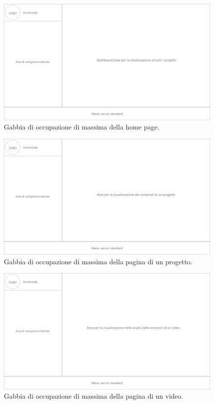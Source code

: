 \begin{figure}[H]
	\centering
	\caption{Gabbia di occupazione di massima della home page.}
	\label{fig:gabbie-massima:home-page}
	\includegraphics[width=\textwidth]{images/gabbie-di-massima/Home}
\end{figure}

\begin{figure}[H]
	\centering
	\caption{Gabbia di occupazione di massima della pagina di un progetto.}
	\label{fig:gabbie-massima:project}
	\includegraphics[width=\textwidth]{images/gabbie-di-massima/Progetto}
\end{figure}

\begin{figure}[H]
	\centering
	\caption{Gabbia di occupazione di massima della pagina di un video.}
	\label{fig:gabbie-massima:video}
	\includegraphics[width=\textwidth]{images/gabbie-di-massima/Video}
\end{figure}